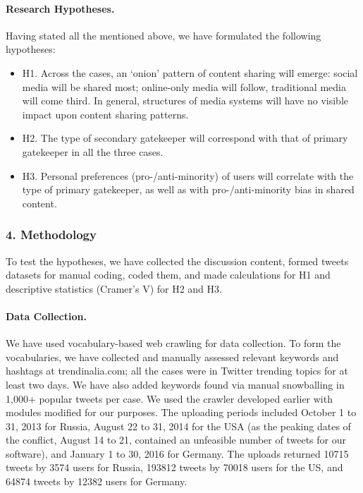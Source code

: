 \paragraph{Research Hypotheses.} Having stated all the mentioned above, we have formulated the following hypotheses:
\begin{itemize}
	\item H1. Across the cases, an ‘onion’ pattern of content sharing will emerge: social media will be shared most; online-only media will follow, traditional media will come third. In general, structures of media systems will have no visible impact upon content sharing patterns.
	\item H2. The type of secondary gatekeeper will correspond with that of primary gatekeeper in all the three cases.
	\item H3. Personal preferences (pro-/anti-minority) of users will correlate with the type of primary gatekeeper, as well as with pro-/anti-minority bias in shared content.
\end{itemize}

\subsubsection{4. Methodology}

To test the hypotheses, we have collected the discussion content, formed tweets datasets for manual coding, coded them, and made calculations for H1 and descriptive statistics (Cramer’s V) for H2 and H3.

\paragraph{Data Collection.} We have used vocabulary-based web crawling for data collection. To form the vocabularies, we have collected and manually assessed relevant keywords and hashtags at trendinalia.com; all the cases were in Twitter trending topics for at least two days. We have also added keywords found via manual snowballing in 1,000+ popular tweets per case. We used the crawler developed earlier with modules modified for our purposes. The uploading periods included October 1 to 31, 2013 for Russia, August 22 to 31, 2014 for the USA (as the peaking dates of the conflict, August 14 to 21, contained an unfeasible number of tweets for our software), and January 1 to 30, 2016 for Germany. The uploads returned 10715 tweets by 3574 users for Russia, 193812 tweets by 70018 users for the US, and 64874 tweets by 12382 users for Germany.

